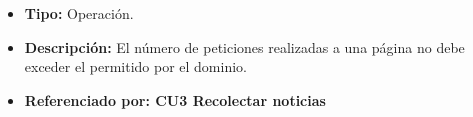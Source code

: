 
\begin{itemize}
  \item \textbf{Tipo:} Operación.
  \item \textbf{Descripción:} El número de peticiones realizadas a una página no debe exceder el permitido por el dominio.
  \item \textbf{Referenciado por: CU3 Recolectar noticias} \\
\end{itemize}
